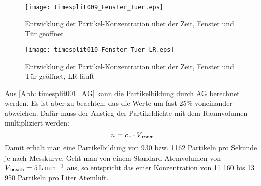 \documentclass[12pt,a4paper,bibtotocnumbered,liststotocnumbered]{scrreprt}
\begin{document}
\begin{figure}[H]
\begin{minipage}[t]{0.49\textwidth}
\texttt{[image: timesplit009\_Fenster\_Tuer.eps]}
\caption{Entwicklung der Partikel-Konzentration über der Zeit, Fenster und Tür geöffnet}
\label{Abb: timesplit009_Fenster_Tuer}
\end{minipage}
\begin{minipage}[t]{0.49\textwidth}
\texttt{[image: timesplit010\_Fenster\_Tuer\_LR.eps]}
\caption{Entwicklung der Partikel-Konzentration über der Zeit, Fenster und Tür geöffnet, \ac{LR} läuft}
\label{Abb: timesplit010_Fenster_Tuer_LR}
\end{minipage}
\end{figure}


Aus \autoref{Abb: timesplit001_AG} kann die Partikelbildung durch \acf{AG} berechnet werden. Es ist aber zu beachten, das die Werte um fast 25\% voneinander abweichen. Dafür muss der Anstieg der Partikeldichte mit dem Raumvolumen multipliziert werden:
\begin{equation}
\dot{n} = c_{\: \mathsf{t}} \cdot V_{\: \mathsf{room}} 
\end{equation}
Damit erhält man eine Partikelbildung von 930 bzw. 1162 Partikeln pro Sekunde je nach Messkurve. Geht man von einem Standard Atemvolumen von $V_{\: \mathsf{breath}} = \SI{5}{\liter\per\minute}$  aus, so entspricht das einer Konzentration von 11 160 bis 13 950 Partikeln pro Liter Atemluft. 
\end{document}
